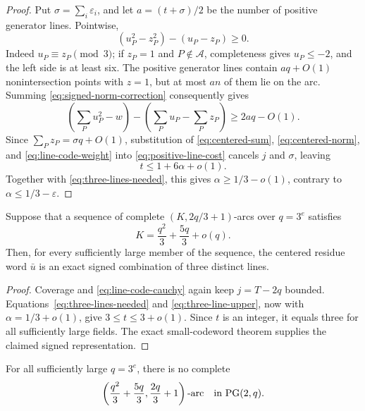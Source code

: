 \begin{proof}
Put \(\sigma=\sum_i\varepsilon_i\), and let
\(a=(t+\sigma)/2\) be the number of positive generator lines.  Pointwise,
\begin{equation}\label{eq:signed-norm-correction}
 (u_P^2-z_P^2)-(u_P-z_P)\ge0.
\end{equation}
Indeed \(u_P\equiv z_P\pmod3\); if \(z_P=1\) and
\(P\notin\mathcal A\), completeness gives \(u_P\le-2\), and the left side
is at least six.  The positive generator lines contain \(aq+O(1)\)
nonintersection points with \(z=1\), but at most \(an\) of them lie on the
arc.  Summing \eqref{eq:signed-norm-correction} consequently gives
\begin{equation}\label{eq:positive-line-cost}
 \left(\sum_Pu_P^2-w\right)-\left(\sum_Pu_P-\sum_Pz_P\right)
 \ge2aq-O(1).
\end{equation}
Since \(\sum_Pz_P=\sigma q+O(1)\), substitution of
\eqref{eq:centered-sum}, \eqref{eq:centered-norm}, and
\eqref{eq:line-code-weight} into \eqref{eq:positive-line-cost} cancels
\(j\) and \(\sigma\), leaving
\begin{equation}\label{eq:three-line-upper}
 t\le1+6\alpha+o(1).
\end{equation}
Together with \eqref{eq:three-lines-needed}, this gives
\(\alpha\ge1/3-o(1)\), contrary to
\(\alpha\le1/3-\varepsilon\).
\end{proof}

\begin{proposition}
\label{prop:three-line-rigidity}
Suppose that a sequence of complete
\((K,2q/3+1)\)-arcs over \(q=3^e\) satisfies
\[
 K=\frac{q^2}{3}+\frac{5q}{3}+o(q).
\]
Then, for every sufficiently large member of the sequence, the centered
residue word \(\bar u\) is an exact signed combination of three distinct
lines.
\end{proposition}

\begin{proof}
Coverage and \eqref{eq:line-code-cauchy} again keep \(j=T-2q\) bounded.
Equations~\eqref{eq:three-lines-needed} and
\eqref{eq:three-line-upper}, now with \(\alpha=1/3+o(1)\), give
\(3\le t\le3+o(1)\).  Since \(t\) is an integer, it equals three for all
sufficiently large fields.  The exact small-codeword theorem supplies the
claimed signed representation.
\end{proof}

\begin{proposition}
\label{prop:exact-five-thirds-endpoint}
For all sufficiently large \(q=3^e\), there is no complete
\[
 \left(\frac{q^2}{3}+\frac{5q}{3},\frac{2q}{3}+1\right)\text{-arc}
 \quad\text{in }\mathrm{PG}(2,q).
\]
\end{proposition}

